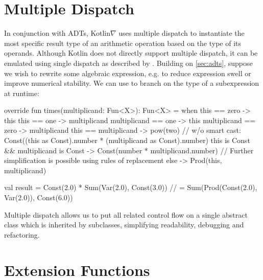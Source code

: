 \section{Multiple Dispatch}\label{sec:multiple-dispatch}

In conjunction with ADTs, Kotlin$\nabla$ uses multiple dispatch to instantiate the most specific result type of an arithmetic operation based on the type of its operands. Although Kotlin does not directly support multiple dispatch, it can be emulated using single dispatch as described by \citet{leavens1998multiple}. Building on \autoref{sec:adts}, suppose we wish to rewrite some algebraic expression, e.g. to reduce expression swell or improve numerical stability. We can use  to branch on the type of a subexpression at runtime:

\begin{kotlinlisting}
override fun times(multiplicand: Fun<X>): Fun<X> =
    when {
        this == zero -> this
        this == one -> multiplicand
        multiplicand == one -> this
        multiplicand == zero -> multiplicand
        this == multiplicand -> pow(two)
        // w/o smart cast: Const((this as Const).number * (multiplicand as Const).number)
        this is Const && multiplicand is Const -> Const(number * multiplicand.number)
        // Further simplification is possible using rules of replacement
        else -> Prod(this, multiplicand)
    }

val result = Const(2.0) * Sum(Var(2.0), Const(3.0))
//         = Sum(Prod(Const(2.0), Var(2.0)), Const(6.0))
\end{kotlinlisting}
%
Multiple dispatch allows us to put all related control flow on a single abstract class which is inherited by subclasses, simplifying readability, debugging and refactoring.

\section{Extension Functions}\label{sec:extension-functions}

